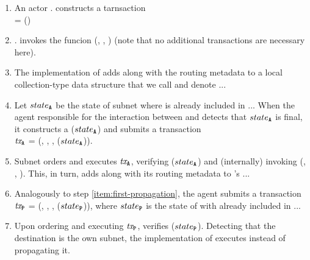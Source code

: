 \begin{enumerate}

    \item An actor . constructs a tarnsaction\\
     = ()

    \item {}. invokes the funcion (, , )
    (note that no additional transactions are necessary here).

    \item The implementation of  adds  along with the routing metadata to a local collection-type data structure
    that we call \postoffice and denote .\gw.\dataField{\postoffice}.

    \item \label{item:first-propagation} Let $state_{\textbf{\texttt{A}}}$ be the state of subnet  where  is already included in .\gw.\dataField{\postoffice}.
    When the \ipc agent responsible for the interaction between  and  detects that $state_{\textbf{\texttt{A}}}$ is final,
    it constructs a {\pof}($state_{\textbf{\texttt{A}}}$) and submits a transaction\\
    $\textit{tx}_{\textbf{\texttt{A}}}$ = (, , , {\pof}($state_{\textbf{\texttt{A}}}$)).

    \item Subnet  orders and executes $\textit{tx}_{\textbf{\texttt{A}}}$, verifying {\pof}($state_{\textbf{\texttt{A}}}$)
    and (internally) invoking (, , ).
    This, in turn, adds  along with its routing metadata to 's \postoffice {}.\gw.\dataField{\postoffice}.

    \item Analogously to step \ref{item:first-propagation}, the \ipc agent submits a transaction\\
    $\textit{tx}_{\textbf{\texttt{P}}}$ = (, , , {\pof}($state_{\textbf{\texttt{P}}}$)),
    where $state_{\textbf{\texttt{P}}}$ is the state of  with  already included in .\gw.\dataField{\postoffice}.

    \item Upon ordering and executing $\textit{tx}_{\textbf{\texttt{P}}}$,  verifies {\pof}($state_{\textbf{\texttt{P}}}$).
    Detecting that the destination is the own subnet, the implementation of  executes  instead of propagating it.

\end{enumerate}



